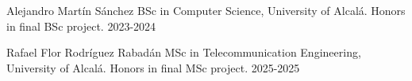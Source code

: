 


\begin{cvhonors}

  \cvhonor
    {Alejandro Martín Sánchez} %
    {BSc in Computer Science, University of Alcalá. Honors in final BSc project.} %
    {} %
    {2023-2024} %

  \cvhonor
    {Rafael Flor Rodríguez Rabadán} %
    {MSc in Telecommunication Engineering, University of Alcalá. Honors in final MSc project.} %
    {} %
    {2025-2025} %

\end{cvhonors}
